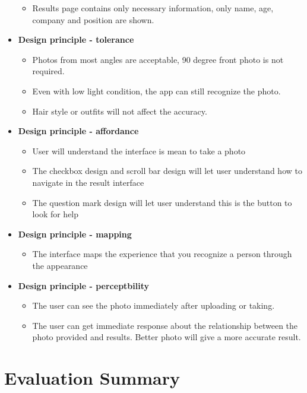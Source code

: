 \documentclass[
	letterpaper, %
]{jdf}
\begin{document}
\begin{itemize}
\begin{itemize}
            \item Results page contains only necessary information, only name, age, company and position are shown.
        \end{itemize}
    \item \textbf{Design principle - tolerance}
        \begin{itemize}
            \item Photos from most angles are acceptable, 90 degree front photo is not required.
            \item Even with low light condition, the app can still recognize the photo.
            \item Hair style or outfits will not affect the accuracy.
        \end{itemize}
    \item \textbf{Design principle - affordance}
        \begin{itemize}
            \item User will understand the interface is mean to take a photo
            \item The checkbox design and scroll bar design will let user understand how to navigate in the result interface
            \item The question mark design will let user understand this is the button to look for help
        \end{itemize}
    \item \textbf{Design principle - mapping}
        \begin{itemize}
            \item The interface maps the experience that you recognize a person through the appearance
        \end{itemize}
    \item \textbf{Design principle - perceptbility}
        \begin{itemize}
            \item The user can see the photo immediately after uploading or taking.
            \item The user can get immediate response about the relationship between the photo provided and results. Better photo will give a more accurate result.
        \end{itemize}
\end{itemize}

\section{Evaluation Summary}
\end{document}
